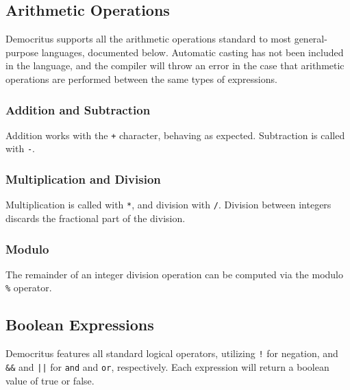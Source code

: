       \iffalse
  		\medskip \noindent 
      Array assignment is done with brackets. Note that the size of the array must be specified in the declaration. 
  		\fi
		
		
	\subsection{Arithmetic Operations}
		Democritus supports all the arithmetic operations standard to most general-purpose languages, documented below. Automatic casting has not been included in the language, and the compiler will throw an error in the case that arithmetic operations are performed between the same types of expressions.  


		
		\subsubsection{Addition and Subtraction}
			Addition works with the \texttt{+} character, behaving as expected. Subtraction is called with \texttt{-}.
						
		\subsubsection{Multiplication and Division} 
		  Multiplication is called with \texttt{*}, and division with \texttt{/}. Division between integers discards the fractional part of the division. 	


    \subsubsection{Modulo}
      The remainder of an integer division operation can be computed via the modulo \texttt{\%} operator.
	    \iffalse
		\subsubsection{Bit Shifting}
			Integers can be bit-shifted with \verb|>>| and \verb|<<|.
	  \fi

	\subsection{Boolean Expressions}
		Democritus features all standard logical operators, utilizing \texttt{!} for negation, and \verb|&&| and \verb^||^ for \texttt{and} and \texttt{or}, respectively. Each expression will return a boolean value of true or false.

